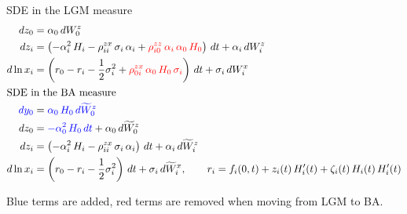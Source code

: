 \documentclass[12pt, a4paper]{article}
\begin{document}
{{\begin{appendix}
SDE in the LGM measure
\begin{align*}
dz_0 &= \alpha_0\,dW_0^z \\
dz_i &= \left(-\alpha_i^2\,H_i -\rho_{ii}^{zx}\,\sigma_i\,\alpha_i + {\color{red} \rho_{i0}^{zz}\,\alpha_i\,\alpha_0\,H_0}\right)\,dt + \alpha_i\,dW_i^z \\
d\ln x_i &= \left(r_0 - r_i - \frac{1}{2}\sigma^2_i + {\color{red} \rho_{0i}^{zx}\,\alpha_0\,H_0\,\sigma_i} \right)\, dt + \sigma_i\,dW_i^x \\
\intertext{SDE in the BA measure}
{\color{blue}dy_0}  & = {\color{blue}\alpha_0\,H_0\,d\widetilde W_0^z} \\
dz_0 &= {\color{blue}-\alpha_0^2\,H_0\,dt} + \alpha_0\,d\widetilde W_0^z \\
dz_i &= \left(-\alpha_i^2\,H_i-\rho_{ii}^{zx}\,\sigma_i\,\alpha_i\right)\,dt + \alpha_i\,d\widetilde W_i^z \\
d\ln x_i &= \left(r_0 - r_i - \frac{1}{2}\sigma^2_i\right)\, dt + \sigma_i\,d\widetilde W_i^x,\qquad 
r_i = f_i(0,t) + z_i(t)\,H'_i(t) + \zeta_i(t)\,H_i(t)\,H'_i(t)
\end{align*}

Blue terms are {\color{blue}added}, red terms are {\color{red}removed} when moving from LGM to BA.

\medskip\noindent


\end{appendix}}}
\end{document}
